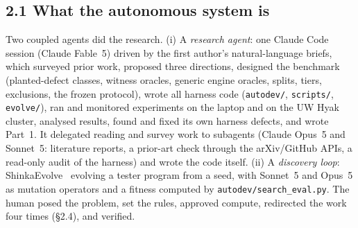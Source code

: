 
\subsection*{2.1 What the autonomous system is}
Two coupled agents did the research. (i) A \emph{research agent}: one Claude Code session (Claude Fable~5) driven by the first author's
natural-language briefs, which surveyed prior work, proposed three directions, designed the benchmark (planted-defect classes, witness
oracles, generic engine oracles, splits, tiers, exclusions, the frozen protocol), wrote all harness code (\texttt{autodev/},
\texttt{scripts/}, \texttt{evolve/}), ran and monitored experiments on the laptop and on the UW Hyak cluster, analysed results, found and
fixed its own harness defects, and wrote Part~1. It delegated reading and survey work to subagents (Claude Opus~5 and Sonnet~5: literature
reports, a prior-art check through the arXiv/GitHub APIs, a read-only audit of the harness) and wrote the code itself. (ii) A
\emph{discovery loop}: ShinkaEvolve~\cite{shinka} evolving a tester program from a seed, with Sonnet~5 and Opus~5 as mutation operators and a
fitness computed by \texttt{autodev/search\_eval.py}. The human posed the problem, set the rules, approved compute, redirected the work
four times (\S2.4), and verified.

